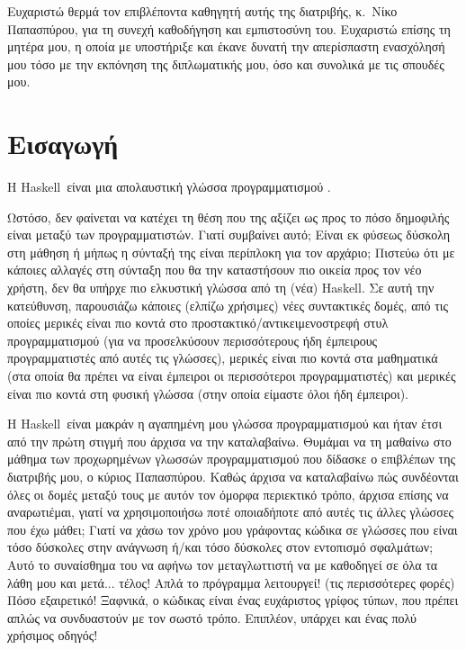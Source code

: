 \documentclass[diploma]{softlab-thesis}
\def\H{Haskell}
\begin{document}

\begin{acknowledgementsgr}
  Ευχαριστώ θερμά τον επιβλέποντα καθηγητή αυτής της διατριβής,
  κ.~Νίκο Παπασπύρου, για τη συνεχή καθοδήγηση και εμπιστοσύνη
  του. Ευχαριστώ επίσης τη μητέρα μου, η οποία με
  υποστήριξε και έκανε δυνατή την απερίσπαστη ενασχόλησή μου τόσο
  με την εκπόνηση της διπλωματικής μου, όσο και συνολικά με τις
  σπουδές μου.
\end{acknowledgementsgr}


\tableofcontents



\mainmatter

\chapter{Εισαγωγή}

Η \H\ είναι μια απολαυστική γλώσσα προγραμματισμού \cite{marlow2010haskell}.

Ωστόσο, δεν φαίνεται να κατέχει τη θέση που της αξίζει ως προς το πόσο
δημοφιλής είναι μεταξύ των προγραμματιστών.
Γιατί συμβαίνει αυτό; Είναι εκ φύσεως δύσκολη στη
μάθηση ή μήπως η σύνταξή της είναι περίπλοκη για τον αρχάριο;
Πιστεύω ότι με κάποιες αλλαγές στη σύνταξη που θα την καταστήσουν πιο
οικεία προς τον νέο χρήστη,
δεν θα υπήρχε πιο ελκυστική γλώσσα από τη (νέα) \H.
Σε αυτή την κατεύθυνση, παρουσιάζω κάποιες (ελπίζω χρήσιμες) νέες
συντακτικές δομές, από τις οποίες μερικές είναι πιο κοντά στο
προστακτικό/αντικειμενοστρεφή στυλ προγραμματισμού
(για να προσελκύσουν περισσότερους ήδη
έμπειρους προγραμματιστές από αυτές τις γλώσσες), μερικές είναι πιο κοντά στα
μαθηματικά (στα οποία θα πρέπει να είναι έμπειροι οι περισσότεροι
προγραμματιστές) και μερικές είναι πιο κοντά στη φυσική γλώσσα (στην οποία
είμαστε όλοι ήδη έμπειροι).

Η \H\ είναι μακράν η αγαπημένη μου γλώσσα προγραμματισμού και ήταν έτσι
από την πρώτη στιγμή που άρχισα να την καταλαβαίνω.
Θυμάμαι να τη μαθαίνω στο μάθημα των προχωρημένων
γλωσσών προγραμματισμού που δίδασκε ο επιβλέπων της διατριβής μου, ο κύριος
Παπασπύρου. Καθώς άρχισα να καταλαβαίνω πώς συνδέονται όλες οι δομές
μεταξύ τους με αυτόν τον όμορφα περιεκτικό τρόπο, άρχισα επίσης να
αναρωτιέμαι, γιατί να χρησιμοποιήσω ποτέ οποιαδήποτε από αυτές τις άλλες
γλώσσες που έχω μάθει; Γιατί να χάσω τον χρόνο μου γράφοντας κώδικα σε
γλώσσες που είναι τόσο δύσκολες στην
ανάγνωση ή/και τόσο δύσκολες στον εντοπισμό σφαλμάτων;
Αυτό το συναίσθημα του να
αφήνω τον μεταγλωττιστή να με καθοδηγεί σε όλα τα λάθη μου και μετά... τέλος!
Απλά το πρόγραμμα λειτουργεί! (τις περισσότερες φορές) Πόσο εξαιρετικό!
Ξαφνικά, ο κώδικας
είναι ένας ευχάριστος γρίφος τύπων, που πρέπει απλώς να συνδυαστούν
με τον σωστό τρόπο. Επιπλέον, υπάρχει και ένας πολύ χρήσιμος οδηγός!
\end{document}
